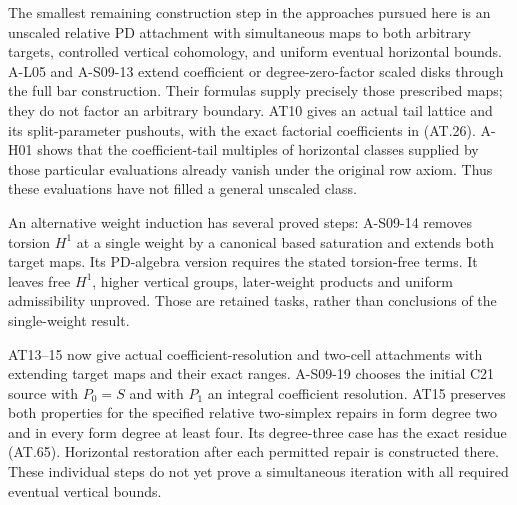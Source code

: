 The smallest remaining construction step in the approaches pursued
here is an unscaled relative PD attachment with simultaneous maps to
both arbitrary targets, controlled vertical cohomology, and uniform
eventual horizontal bounds.  A-L05 and A-S09-13 extend coefficient
or degree-zero-factor scaled disks through the full bar construction.
Their formulas supply precisely those prescribed maps; they do not
factor an arbitrary boundary.  AT10 gives an actual tail lattice and
its split-parameter pushouts, with the exact factorial coefficients
in (AT.26).  A-H01 shows that the coefficient-tail multiples of
horizontal classes supplied by those particular evaluations already
vanish under the original row axiom.  Thus these evaluations have
not filled a general unscaled class.

An alternative weight induction has several proved steps:
A-S09-14 removes torsion $H^1$ at a single weight by a canonical
based saturation and extends both target maps.  Its PD-algebra
version requires the stated torsion-free terms.  It leaves free
$H^1$, higher vertical groups, later-weight products and uniform
admissibility unproved.  Those are retained tasks, rather than
conclusions of the single-weight result.

AT13--15 now give actual coefficient-resolution and two-cell
attachments with extending target maps and their exact ranges.
A-S09-19 chooses the initial C21 source with $P_0=S$ and with
$P_1$ an integral coefficient resolution.  AT15 preserves both
properties for the specified relative two-simplex repairs in
form degree two and in every form degree at least four.  Its
degree-three case has the exact residue (AT.65).  Horizontal
restoration after each permitted repair is constructed there.
These individual steps do not yet prove a simultaneous iteration
with all required eventual vertical bounds.


